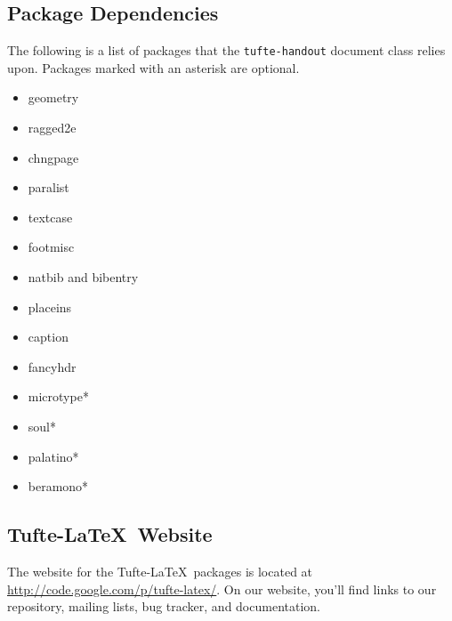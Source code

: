 \documentclass[nofonts]{tufte-handout}
\begin{document}
\subsection{Package Dependencies}\label{sec:dependencies}
The following is a list of packages that the \Verb|tufte-handout| document
class relies upon.  Packages marked with an asterisk are optional.
\begin{multicols}{2}
\begin{itemize}
  \item geometry
  \item ragged2e
  \item chngpage
  \item paralist
  \item textcase
  \item footmisc
  \item natbib and bibentry
  \item placeins
  \item caption
  \item fancyhdr 
  \item microtype*
  \item soul*
  \item palatino*
  \item beramono*
\end{itemize}
\end{multicols}

\subsection{Tufte-\LaTeX\ Website}\label{sec:website}
The website for the Tufte-\LaTeX\ packages is located at
\url{http://code.google.com/p/tufte-latex/}.  On our website, you'll find
links to our  repository, mailing lists, bug tracker, and documentation.





\end{document}
